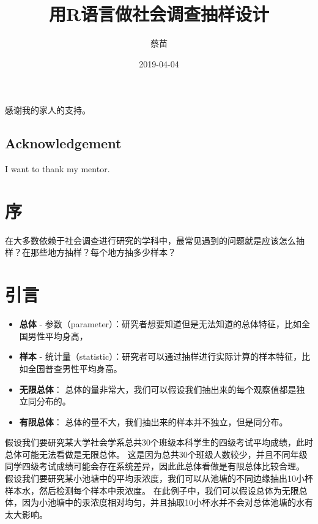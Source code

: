 \documentclass[fontset=fandol,zihao=false,scheme=chinese,heading=true,UTF8]{ctexbook}
\title{用R语言做社会调查抽样设计}
\author{蔡苗}
\date{2019-04-04}
\newenvironment{dedication}
{
   \cleardoublepage
   \thispagestyle{empty}
   \vspace*{\stretch{1}}
   \hfill\begin{minipage}[t]{0.66\textwidth}
   \raggedright
}
{
   \end{minipage}
   \vspace*{\stretch{3}}
   \clearpage
}
\begin{document}
\maketitle

\begin{dedication}
感谢我的家人的支持。
\end{dedication}

\section*{Acknowledgement}

I want to thank my mentor.

{
\setcounter{tocdepth}{2}
\tableofcontents
}
\listoftables
\listoffigures



\hypertarget{section}{%
\chapter{序}\label{section}}

在大多数依赖于社会调查进行研究的学科中，最常见遇到的问题就是应该怎么抽样？在那些地方抽样？每个地方抽多少样本？

\cleardoublepage 
\mainmatter

\hypertarget{section-1}{%
\chapter{引言}\label{section-1}}

\begin{itemize}
\item
  \textbf{总体} - 参数（parameter）：研究者想要知道但是无法知道的总体特征，比如全国男性平均身高，
\item
  \textbf{样本} - 统计量（statistic）：研究者可以通过抽样进行实际计算的样本特征，比如全国普查男性平均身高。
\item
  \textbf{无限总体}： 总体的量非常大，我们可以假设我们抽出来的每个观察值都是独立同分布的。
\item
  \textbf{有限总体}： 总体的量不大，我们抽出来的样本并不独立，但是同分布。
\end{itemize}

假设我们要研究某大学社会学系总共30个班级本科学生的四级考试平均成绩，此时总体可能无法看做是无限总体。
这是因为总共30个班级人数较少，并且不同年级同学四级考试成绩可能会存在系统差异，因此此总体看做是有限总体比较合理。
假设我们要研究某小池塘中的平均汞浓度，我们可以从池塘的不同边缘抽出10小杯样本水，然后检测每个样本中汞浓度。
在此例子中，我们可以假设总体为无限总体，因为小池塘中的汞浓度相对均匀，并且抽取10小杯水并不会对总体池塘的水有太大影响。
\end{document}
